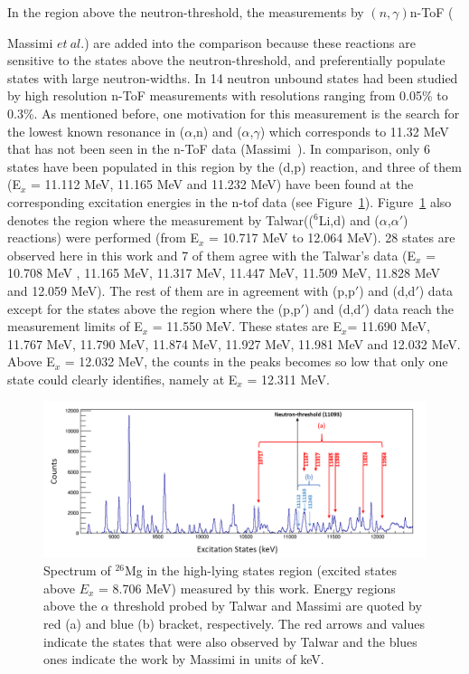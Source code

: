 In the region above the neutron-threshold, the measurements by $(n,\gamma)$n-ToF  ({Massimi $et\ al.$\citep{MASSIMI2017}\citep{Massimi}) are added into the comparison because these reactions are sensitive to the states above the neutron-threshold, and preferentially populate states with large neutron-widths. In \citep{MASSIMI2017} 14 neutron unbound states had been studied by high resolution  n-ToF measurements\citep{MASSIMI2017} with resolutions ranging from 0.05\% to 0.3\%.   As mentioned before,  one motivation for this measurement is the search for the lowest known resonance in ($\alpha$,n) and ($\alpha$,$\gamma$) which corresponds to 11.32 MeV that has not been seen in the n-ToF data (Massimi~\citep{MASSIMI2017}\citep{Massimi}). In comparison, only 6 states  have been populated  in this region by the (d,p) reaction, and three of them (E$_x$ = 11.112 MeV, 11.165 MeV and 11.232 MeV) have been found at  the corresponding excitation energies in the n-tof data (see Figure~\ref{fig:states2}).
Figure~\ref{fig:states2} also denotes the region where the measurement by Talwar\citep{Rashi2016}(($^6$Li,d) and ($\alpha$,$\alpha'$) reactions) were performed (from E$_x$ = 10.717 MeV to 12.064 MeV). 28 states are observed here in this work and 7 of them agree with the Talwar's data (E$_x$ = 10.708 MeV , 11.165 MeV, 11.317 MeV, 11.447 MeV, 11.509 MeV, 11.828 MeV and 12.059 MeV). The rest of them are in agreement with (p,p$'$) and (d,d$'$) data except for the states above the region where the (p,p$'$) and (d,d$'$) data reach the measurement limits of E$_x$ = 11.550 MeV. These states are E$_x$= 11.690 MeV, 11.767 MeV, 11.790 MeV, 11.874 MeV, 11.927 MeV, 11.981 MeV and 12.032 MeV.  Above E$_x$ =  12.032 MeV, the counts in the peaks becomes so low that only one state could clearly identifies, namely at E$_x$ = 12.311 MeV.

\begin{landscape}
    \begin{figure}[tpb]
    \centerline{\includegraphics[scale=0.8]{graph/ch5/states2}}
    \caption{Spectrum of $^{26}$Mg in the high-lying states region (excited states above $E_x$ = 8.706 MeV) measured by this work. Energy regions above the $\alpha$ threshold probed by Talwar\citep{Rashi2016} and Massimi\citep{MASSIMI2017} are quoted by red (a) and blue (b) bracket, respectively. The red arrows and values indicate the states that were also observed by Talwar and the blues ones indicate the work by Massimi in units of keV.}
    \label{fig:states2}
    \end{figure}
\end{landscape}

}
